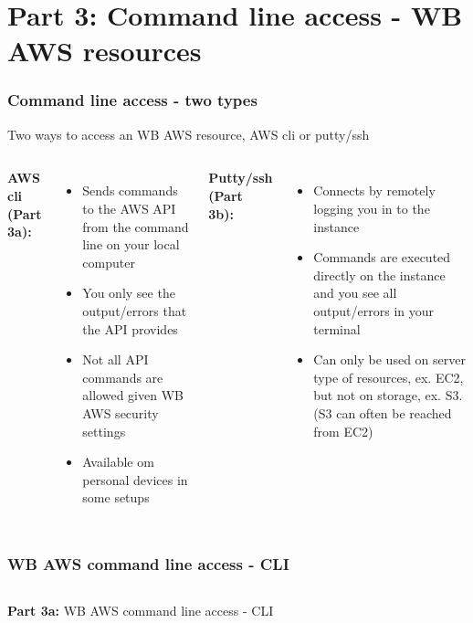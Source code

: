 \documentclass[aspectratio=169]{beamer} %
\begin{document}
\section{Part 3: Command line access - WB AWS resources}

\begin{frame}
	\frametitle{Command line access - two types}

	Two ways to access an WB AWS resource, AWS cli or putty/ssh

	\vspace{.5cm}

	\begin{columns}[t]
		
		\textbf{AWS cli (Part 3a):}
		\begin{itemize}
			\item Sends commands to the AWS API from the command line on your local computer
			\item You only see the output/errors that the API provides
			\item Not all API commands are allowed given WB AWS security settings
			\item Available om personal devices in some setups
		\end{itemize}
	
		\textbf{Putty/ssh (Part 3b):}
		\begin{itemize}
			\item Connects by remotely logging you in to the instance
			\item Commands are executed directly on the instance and you see all output/errors in your terminal
			\item Can only be used on server type of resources, ex. EC2, but not on storage, ex. S3. (S3 can often be reached from EC2) 
		\end{itemize}
		
	\end{columns}
\end{frame}

\begin{frame}
	\frametitle{WB AWS command line access - CLI}
	\begin{columns}[c]
		
		
		\textbf{Part 3a:} WB AWS command line access - CLI
		
	\end{columns}
\end{frame}
\end{document}

